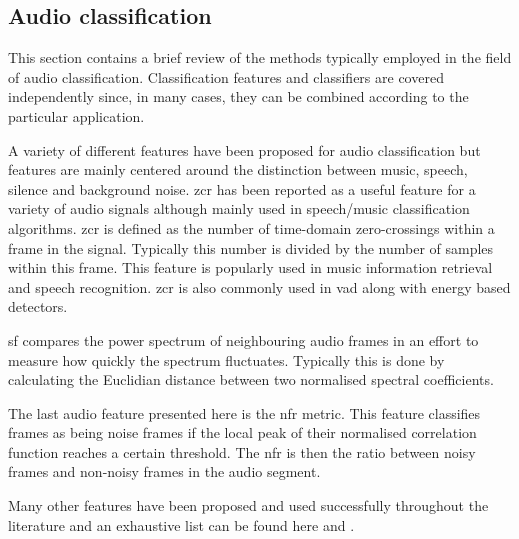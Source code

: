 %

\subsection{Audio classification}
This section contains a brief review of the methods typically employed in the field of audio classification. Classification features and classifiers are covered independently since, in many cases, they can be combined according to the particular application.

A variety of different features have been proposed for audio classification but features are mainly centered around the distinction between music, speech, silence and background noise. \gls{zcr} has been reported as a useful feature for a variety of audio signals although mainly used in speech/music classification algorithms\cite{Lu2002}. \gls{zcr} is defined as the number of time-domain zero-crossings within a frame in the signal. Typically this number is divided by the number of samples within this frame. This feature is popularly used in music information retrieval and speech recognition\cite{Saraceno1997}\cite{Scheirer1997}\cite{Gouyon2000}. \gls{zcr} is also commonly used in \gls{vad} along with energy based detectors\cite{Sangwan2002}.

\gls{sf} compares the power spectrum of neighbouring audio frames in an effort to measure how quickly the spectrum fluctuates. Typically this is done by calculating the Euclidian distance between two normalised spectral coefficients\cite{Wang2012}.

The last audio feature presented here is the \gls{nfr} metric. This feature classifies frames as being noise frames if the local peak of their normalised correlation function reaches a certain threshold. The \gls{nfr} is then the ratio between noisy frames and non-noisy frames in the audio segment\cite{Lu2002}\cite{Jiang2000}.

Many other features have been proposed and used successfully throughout the literature and an exhaustive list can be found here \cite{Scheirer1997} and \cite{Gouyon2000}.

